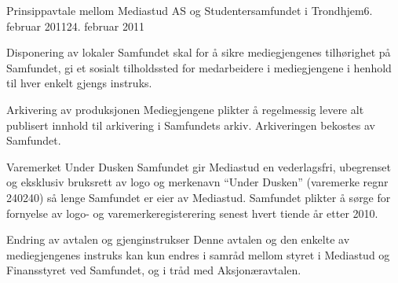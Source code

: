 \begin{instruks}{Prinsippavtale mellom Mediastud AS og Studentersamfundet i Trondhjem}{6. februar 2011}{24. februar 2011}
    \begin{instruksledd}{Disponering av lokaler }
        Samfundet skal for å sikre mediegjengenes tilhørighet på Samfundet, gi et sosialt
        tilholdssted for
        medarbeidere i mediegjengene i henhold til hver enkelt gjengs instruks.
    \end{instruksledd}

    \begin{instruksledd}{Arkivering av produksjonen}
        Mediegjengene plikter å regelmessig levere alt publisert innhold til arkivering i
        Samfundets arkiv.  Arkiveringen bekostes av Samfundet.
    \end{instruksledd}
\pagebreak
    \begin{instruksledd}{Varemerket Under Dusken }
        Samfundet gir Mediastud en vederlagsfri, ubegrenset og eksklusiv bruksrett av logo
        og merkenavn
        ``Under Dusken'' (varemerke regnr 240240) så lenge Samfundet er eier av Mediastud.
        Samfundet
        plikter å sørge for fornyelse av logo- og varemerkeregisterering senest hvert
        tiende år etter 2010.
    \end{instruksledd}

    \begin{instruksledd}{ Endring av avtalen og gjenginstrukser } 
        Denne avtalen og den enkelte av mediegjengenes instruks kan kun endres i samråd
        mellom styret i
        Mediastud og Finansstyret ved Samfundet, og i tråd med Aksjonæravtalen.
    \end{instruksledd}

\end{instruks}


